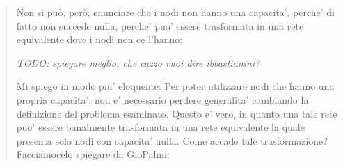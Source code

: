 \begin{quote}
  Non si può, però, enunciare che i nodi non hanno una capacita', perche' di fatto non succede nulla, perche' puo' essere trasformata in una rete equivalente dove i nodi non ce l'hanno:

  \hfill \textit{TODO: spiegare meglio, che cazzo vuoi dire ibbastianini?}

  Mi spiego in modo piu' eloquente: Per poter utilizzare nodi che hanno una propria capacita', non e' necessario perdere generalita' cambiando la definizione del problema esaminato. Questo e' vero, in quanto una tale rete puo' essere banalmente trasformata in una rete equivalente la quale presenta solo nodi con capacita' nulla. Come accade tale trasformazione? Facciamocelo spiegare da GioPalmi:
\end{quote}

